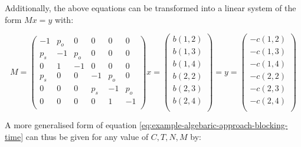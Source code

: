 Additionally, the above equations can be transformed into a linear system of the form \(Mx=y\) with:

\begin{equation}\label{eq:example-algebaric-approach-blocking-time}
    M=
    \begin{pmatrix}
        -1 & p_o & 0 & 0 & 0 & 0 \\ %
        p_s & -1 & p_o & 0 & 0 & 0 \\ %
        0 & 1 & -1 & 0 & 0 & 0 \\ %
        p_s & 0 & 0 & -1 & p_o & 0\\ %
        0 & 0 & 0 & p_s & -1 & p_o \\ %
        0 & 0 & 0 & 0 & 1 & -1 \\ %
    \end{pmatrix}
    x=
    \begin{pmatrix}
        b(1,2) \\
        b(1,3) \\
        b(1,4) \\
        b(2,2) \\
        b(2,3) \\
        b(2,4) \\
    \end{pmatrix}
    = 
    y=
    \begin{pmatrix}
        -c(1,2) \\
        -c(1,3) \\
        -c(1,4) \\
        -c(2,2) \\
        -c(2,3) \\
        -c(2,4) \\
    \end{pmatrix}
\end{equation}

A more generalised form of equation \ref{eq:example-algebaric-approach-blocking-time}
can thus be given for any value of \(C,T,N,M\) by:

